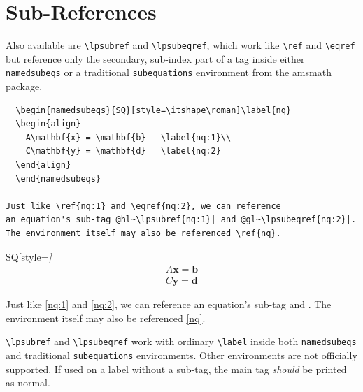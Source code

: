 \documentclass{article}
\newcommand{\hl}[1]{\colorbox{SeaGreen!30}{#1}}
\newcommand{\gl}[1]{\colorbox{Thistle!30}{#1}}
\begin{document}
\section{Sub-References}\label{sec:subrefs}
Also available are \verb|\lpsubref| and \verb|\lpsubeqref|, which work like \verb|\ref| and \verb|\eqref| but reference only the secondary, sub-index part of a tag inside either \verb|namedsubeqs| or a traditional \verb|subequations| environment from the \textsf{amsmath} package.
\begin{tcolorbox}
  \begin{Verbatim}
  \begin{namedsubeqs}{SQ}[style=\itshape\roman]\label{nq}
  \begin{align}
    A\mathbf{x} = \mathbf{b}   \label{nq:1}\\
    C\mathbf{y} = \mathbf{d}   \label{nq:2}
  \end{align}
  \end{namedsubeqs}

Just like \ref{nq:1} and \eqref{nq:2}, we can reference
an equation's sub-tag @hl~\lpsubref{nq:1}| and @gl~\lpsubeqref{nq:2}|.
The environment itself may also be referenced \ref{nq}.

  \end{Verbatim}
\tcblower
    \begin{namedsubeqs}{SQ}[style=\itshape\roman]\label{nq}
    \begin{align}
      A\mathbf{x} = \mathbf{b}   \label{nq:1}\\
      C\mathbf{y} = \mathbf{d}   \label{nq:2}
    \end{align}
    \end{namedsubeqs}

Just like \ref{nq:1} and \eqref{nq:2}, we can reference
an equation's sub-tag \hl{} and \gl{}.
The environment itself may also be referenced \ref{nq}.
\end{tcolorbox}
\verb|\lpsubref| and \verb|\lpsubeqref| work with ordinary \verb|\label| inside both \verb|namedsubeqs| and traditional \verb|subequations| environments. Other environments are not officially supported. If used on a label without a sub-tag, the main tag \emph{should} be printed as normal.
\end{document}
